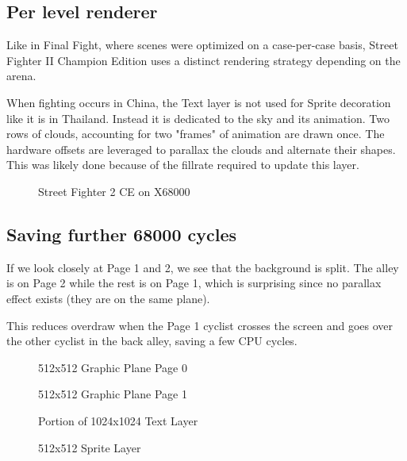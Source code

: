 \subsection{Per level renderer}
Like in Final Fight, where scenes were optimized on a case-per-case basis, Street Fighter II Champion Edition uses a distinct rendering strategy depending on the arena.

When fighting occurs in China, the Text layer is not used for Sprite decoration like it is in Thailand. Instead it is dedicated to the sky and its animation. Two rows of clouds, accounting for two "frames" of animation are drawn once. The hardware offsets are leveraged to parallax the clouds and alternate their shapes. This was likely done because of the fillrate required to update this layer.



\begin{figure}[H]
\caption*{Street Fighter 2 CE on X68000}
\end{figure}


\subsection{Saving further 68000 cycles}
If we look closely at Page 1 and 2, we see that the background is split. The alley is on Page 2 while the rest is on Page 1, which is surprising since no parallax effect exists (they are on the same plane). 

This reduces overdraw when the Page 1 cyclist crosses the screen and goes over the other cyclist in the back alley, saving a few CPU cycles.

\begin{minipage}[t]{0.49\linewidth}
\setlength{\intextsep}{0pt}
\begin{figure}[H]
\caption*{512x512 Graphic Plane Page 0}
\end{figure}
\end{minipage}%
\hfill
\begin{minipage}[t]{0.49\linewidth}
\setlength{\intextsep}{0pt}
  \begin{figure}[H]
  \caption*{512x512 Graphic Plane Page 1}
  \end{figure}
\end{minipage}%

\begin{minipage}[t]{0.49\linewidth}
  \begin{figure}[H]
  \caption*{Portion of 1024x1024 Text Layer}
  \end{figure}
\end{minipage}%
\hfill
\begin{minipage}[t]{0.49\linewidth}
   \begin{figure}[H]
  \caption*{512x512 Sprite Layer}
  \end{figure}
\end{minipage}%



